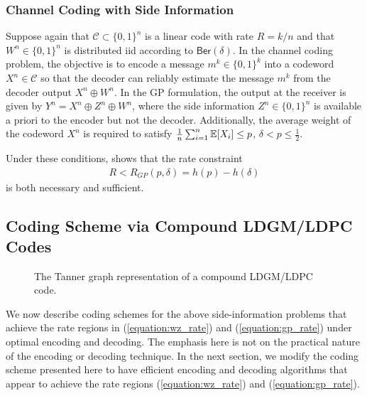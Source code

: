 \subsubsection{Channel Coding with Side Information}
Suppose again that $\mathcal{C} \subset \{0,1\}^n$ is a linear code with rate $R=k/n$ and that $W^n \in \{0,1\}^n$ is distributed iid according to $\mathsf{Ber}(\delta)$.
In the channel coding problem, the objective is to encode a message $m^k \in \{0,1\}^{k}$ into a codeword $X^n \in \mathcal{C}$ so that the decoder can reliably estimate the message $m^k$ from the decoder output $X^n \oplus W^n$.
In the GP formulation, the output at the receiver is given by $Y^n = X^n \oplus Z^n \oplus W^n$, where the side information $Z^n \in \{0,1\}^n$ is available a priori to the encoder but not the decoder.
Additionally, the average weight of the codeword $X^n$ is required to satisfy $\frac{1}{n} \sum_{i=1}^n \mathbb{E} [X_i] \leq p$,  $\delta < p \leq \tfrac{1}{2}$. 

Under these conditions, \cite{Gelfand-ppi80} shows that the rate constraint
\begin{align}
  \label{equation:gp_rate}
  R < R_{GP}(p,\delta)=h(p) - h(\delta)
\end{align}
is both necessary and sufficient.

\subsection{Coding Scheme via Compound LDGM/LDPC Codes}

\begin{figure}[!t]
  \centering
  \setlength\tikzheight{5cm}
  \setlength\tikzwidth{6cm}
  \scalebox{0.8}{}
  \vspace{-2.5mm}
  \caption{The Tanner graph representation of a compound LDGM/LDPC code.
  }
  \label{figure:tanner_graph_compound_code}
\end{figure}
We now describe coding schemes for the above side-information problems that achieve the rate regions in (\ref{equation:wz_rate}) and (\ref{equation:gp_rate}) under optimal encoding and decoding.
The emphasis here is not on the practical nature of the encoding or decoding technique.
In the next section, we modify the coding scheme presented here to have efficient encoding and decoding algorithms that appear to achieve the rate regions (\ref{equation:wz_rate}) and (\ref{equation:gp_rate}).

